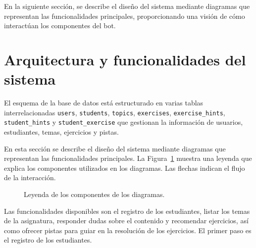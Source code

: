 En la siguiente sección, se describe el diseño del sistema mediante diagramas que representan las funcionalidades principales, proporcionando una visión de cómo interactúan los componentes del bot.

\section{Arquitectura y funcionalidades del sistema}\label{sec:features}

El esquema de la base de datos está estructurado en varias tablas interrelacionadas \texttt{users}, \texttt{students}, \texttt{topics}, \texttt{exercises}, \texttt{exercise\_hints}, \texttt{student\_hints} y \texttt{student\_exercise} que gestionan la información de usuarios, estudiantes, temas, ejercicios y pistas.

En esta sección se describe el diseño del sistema mediante diagramas que representan las funcionalidades principales. La Figura~\ref{fig:legend} muestra una leyenda que explica los componentes utilizados en los diagramas. Las flechas indican el flujo de la interacción.

\begin{figure}[h!]
  \centering
      \caption{Leyenda de los componentes de los diagramas.}\label{fig:legend}
\end{figure}

Las funcionalidades disponibles son el registro de los estudiantes, listar los temas de la asignatura, responder dudas sobre el contenido y recomendar ejercicios, así como ofrecer pistas para guiar en la resolución de los ejercicios. El primer paso es el registro de los estudiantes.

